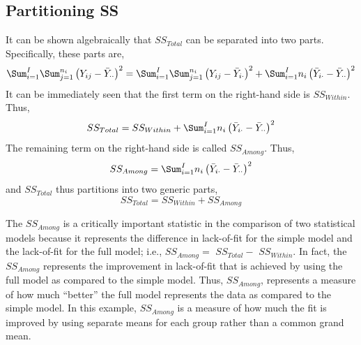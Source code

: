 \documentclass[10pt,openany]{book}\usepackage[]{graphicx}\usepackage[]{color}
\begin{document}
\subsection*{Partitioning SS}
It can be shown algebraically  that $SS_{Total}$ can be separated into two parts.  Specifically, these parts are,
\begin{equation} \label{eqn:SSPartitionSpecific}
  \Sum_{i=1}^{I}\Sum_{j=1}^{n_{i}}\left(Y_{ij}-\bar{Y}_{\cdot\cdot}\right)^{2} = \Sum_{i=1}^{I}\Sum_{j=1}^{n_{i}}\left(Y_{ij}-\bar{Y}_{i\cdot}\right)^{2} + \Sum_{i=1}^{I}n_{i}\left(\bar{Y}_{i\cdot}-\bar{Y}_{\cdot\cdot}\right)^{2}
\end{equation}
It can be immediately seen that the first term on the right-hand side is $SS_{Within}$.  Thus,
\[ SS_{Total} = SS_{Within} + \Sum_{i=1}^{I}n_{i}\left(\bar{Y}_{i\cdot}-\bar{Y}_{\cdot\cdot}\right)^{2} \]
The remaining term on the right-hand side is called $SS_{Among}$.  Thus,
\begin{equation} \label{eqn:SSamong}
  SS_{Among} = \Sum_{i=1}^{I}n_{i}\left(\bar{Y}_{i\cdot}-\bar{Y}_{\cdot\cdot}\right)^{2}
\end{equation}
and $SS_{Total}$ thus partitions into two generic parts,
\begin{equation} \label{eqn:SSPartitionGnrl}
  SS_{Total} = SS_{Within} + SS_{Among}
\end{equation}

The $SS_{Among}$ is a critically important statistic in the comparison of two statistical models because it represents the difference in lack-of-fit for the simple model and the lack-of-fit for the full model; i.e., $SS_{Among}=$ $SS_{Total}-$ $SS_{Within}$.  In fact, the $SS_{Among}$ represents the improvement in lack-of-fit that is achieved by using the full model as compared to the simple model.  Thus, $SS_{Among}$, represents a measure of how much ``better'' the full model represents the data as compared to the simple model.  In this example, $SS_{Among}$ is a measure of how much the fit is improved by using separate means for each group rather than a common grand mean.


\vspace{-12pt}
\end{document}
